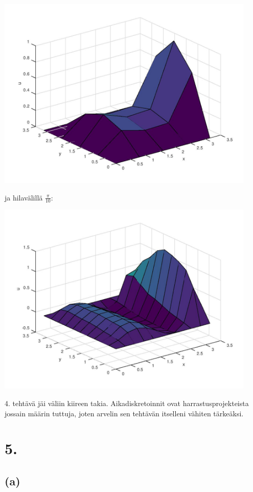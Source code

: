 \documentclass{article}
\begin{document}
\includegraphics[width=350pt]{w3_3-4p.jpg}

ja hilavälillä $\frac{\pi}{10}$:

\includegraphics[width=350pt]{w3_3-10p.jpg}

\newpage

4. tehtävä jäi väliin kiireen takia. Aikadiskretoinnit ovat
harrastusprojekteista jossain määrin tuttuja, joten arvelin sen tehtävän
itselleni vähiten tärkeäksi.

\section*{5.}

\subsection*{(a)}
\end{document}
